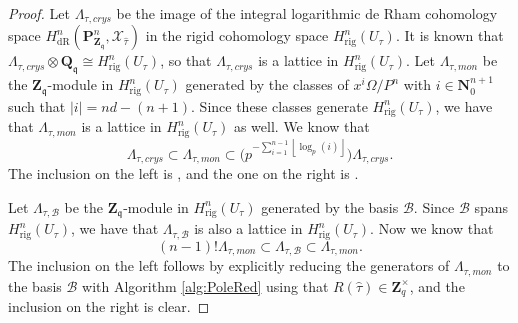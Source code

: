 \documentclass[a4paper,11pt]{article}
\numberwithin{equation}{section}
\providecommand{\abs}[1]{\lvert#1\rvert}                 %
\providecommand{\floor}[1]{\left\lfloor#1\right\rfloor}   %
\newcommand{\NN}{\mathbf{N}} %
\newcommand{\ZZ}{\mathbf{Z}} %
\newcommand{\QQ}{\mathbf{Q}} %
\providecommand{\HdR}{H_{\text{dR}}}    %
\providecommand{\Hrig}{H_{\text{rig}}}  %
\providecommand{\cB}{\mathcal{B}} %
\theoremstyle{definition}
\begin{document}
\begin{proof}
Let $\Lambda_{\tau, crys}$ be the image of the integral logarithmic de Rham cohomology space
$\HdR^n(\mathbf{P}_{\mathbf{Z}_{\mathfrak{q}}}^n,\mathcal{X}_{\hat{\tau}})$ in the rigid cohomology
space $\Hrig^n(U_{\tau})$. It is known that
$\Lambda_{\tau, crys} \otimes \QQ_{\mathfrak{q}} \cong \Hrig^n(U_{\tau})$, so that
$\Lambda_{\tau, crys}$ is a lattice in $\Hrig^n(U_{\tau})$. Let $\Lambda_{\tau, mon}$
be the $\ZZ_{\mathfrak{q}}$-module in $\Hrig^n(U_{\tau})$ generated by the classes
of $x^i \Omega/P^n$ with $i \in \NN_0^{n+1}$ such that $\abs{i}=nd-(n+1)$. Since
these classes generate $\Hrig^n(U_{\tau})$, we have that $\Lambda_{\tau,mon}$ is a 
lattice in $\Hrig^n(U_{\tau})$ as well. We know that
\[
\Lambda_{\tau,crys} \subset \Lambda_{\tau,mon} \subset \bigl( p^{-\sum_{i=1}^{n-1} \floor{\log_p(i)}} \bigr) \Lambda_{\tau,crys}.
\]
The inclusion on the left is \cite[Lemma 3.4.3]{AbbottKedlayaRoe2006}, and the one on the right 
is \cite[Proposition 3.4.6]{AbbottKedlayaRoe2006}.

Let $\Lambda_{\tau,\cB}$ be the $\ZZ_{\mathfrak{q}}$-module in $\Hrig^n(U_{\tau})$ generated 
by the basis $\cB$. Since $\cB$ spans $\Hrig^n(U_{\tau})$, we have that $\Lambda_{\tau,\cB}$ is also a 
lattice in $\Hrig^n(U_{\tau})$. Now we know that
\[
(n-1)! \Lambda_{\tau,mon} \subset \Lambda_{\tau,\cB} \subset \Lambda_{\tau,mon}. 
\]
The inclusion on the left follows by explicitly reducing the generators of $\Lambda_{\tau,mon}$ 
to the basis $\cB$ with Algorithm \ref{alg:PoleRed} using that $R(\hat{\tau}) \in \ZZ_q^{\times}$, and
the inclusion on the right is clear.


\end{proof}
\end{document}
